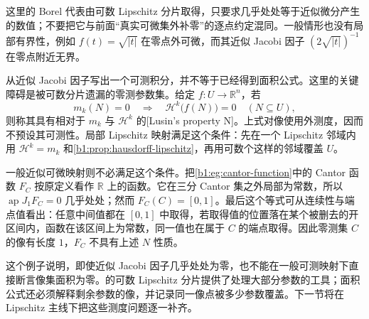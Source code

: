 这里的 Borel 代表由可数 Lipschitz 分片取得，只要求几乎处处等于近似微分产生的数值；不要把它与前面“真实可微集外补零”的逐点约定混同。一般情形也没有局部有界性，例如 \(f(t)=\sqrt{|t|}\) 在零点外可微，而其近似 Jacobi 因子 \((2\sqrt{|t|})^{-1}\) 在零点附近无界。

\ProseParagraphBreak

从近似 Jacobi 因子写出一个可测积分，并不等于已经得到面积公式。这里的关键障碍是被可数分片遗漏的零测参数集。给定 \(f:U\to\mathbb R^n\)，若
\[
m_k(N)=0\quad\Longrightarrow\quad\mathcal H^k\bigl(f(N)\bigr)=0
\quad(N\subseteq U),
\]
则称其具有相对于 \(m_k\) 与 \(\mathcal H^k\) 的[Lusin's property N]。上式对像使用外测度，因而不预设其可测性。局部 Lipschitz 映射满足这个条件：先在一个 Lipschitz 邻域内用 \(\mathcal H^k=m_k\) 和\cref{b1:prop:hausdorff-lipschitz}，再用可数个这样的邻域覆盖 \(U\)。

\ProseParagraphBreak

一般近似可微映射则不必满足这个条件。把\cref{b1:eg:cantor-function}中的 Cantor 函数 \(F_C\) 按原定义看作 \(\mathbb R\) 上的函数。它在三分 Cantor 集之外局部为常数，所以 \(\operatorname{ap}J_1F_C=0\) 几乎处处；然而 \(F_C(C)=[0,1]\)。最后这个等式可从连续性与端点值看出：任意中间值都在 \([0,1]\) 中取得，若取得值的位置落在某个被删去的开区间内，函数在该区间上为常数，同一值也在属于 \(C\) 的端点取得。因此零测集 \(C\) 的像有长度 \(1\)，\(F_C\) 不具有上述 \(N\) 性质。

\ProseParagraphBreak

这个例子说明，即使近似 Jacobi 因子几乎处处为零，也不能在一般可测映射下直接断言像集面积为零。的可数 Lipschitz 分片提供了处理大部分参数的工具；面积公式还必须解释剩余参数的像，并记录同一像点被多少参数覆盖。下一节将在 Lipschitz 主线下把这些测度问题逐一补齐。
